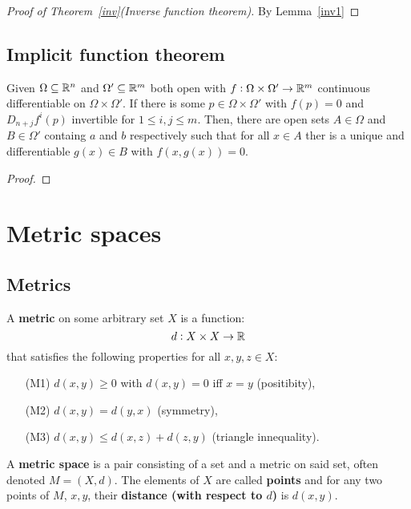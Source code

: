 \documentclass[../Year2.tex]{subfiles}
\begin{document}
\begin{proof}[Proof of Theorem~\ref{inv}(Inverse function theorem)]
    By Lemma~\ref{inv1} 
\end{proof}

\subsection{Implicit function theorem}

\begin{theorem}
    Given $\Omega\subseteq\mathbb{R}^n$ and $\Omega'\subseteq\mathbb{R}^m$ both open with $f:\Omega\times\Omega'\rightarrow\mathbb{R}^m$ continuous differentiable on $\Omega\times\Omega'$. If there is some $p\in\Omega\times\Omega'$ with $f(p)=0$ and $D_{n+j}f^i(p)$ invertible for $1\leq i, j\leq m$. Then, there are open sets $A\in\Omega$ and $B\in\Omega'$ containg $a$ and $b$ respectively such that for all $x\in A$ ther is a unique and differentiable $g(x)\in B$ with $f(x,g(x))=0$.
    \begin{proof}
        
    \end{proof}
\end{theorem}

\section{Metric spaces}

\subsection{Metrics}

\begin{definition}[Metric]
    A \textbf{metric} on some arbitrary set $X$ is a function: \[
        d:X\times X\rightarrow\mathbb{R}
    \] that satisfies the following properties for all $x,y,z\in X$: \begin{enumerate}
        \item[(M1)] $d(x,y)\geq 0$ with $d(x,y)=0$ iff $x=y$ (positibity),
        \item[(M2)] $d(x,y)=d(y,x)$ (symmetry),
        \item[(M3)] $d(x,y) \leq d(x,z) + d(z,y)$ (triangle innequality).
    \end{enumerate}
\end{definition}

\begin{definition}
    A \textbf{metric space} is a pair consisting of a set and a metric on said set, often denoted $M=(X,d)$. The elements of $X$ are called \textbf{points} and for any two points of $M$, $x,y$, their \textbf{distance (with respect to $d$)} is $d(x,y)$.
\end{definition}
\end{document}
